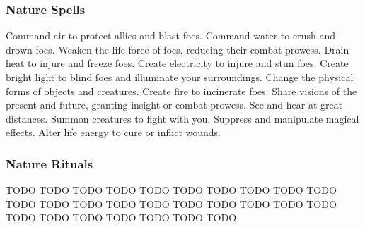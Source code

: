 \subsubsection{Nature Spells}\label{Nature Spells}
\begin{spelllist}
 Command air to protect allies and blast foes.
 Command water to crush and drown foes.
 Weaken the life force of foes, reducing their combat prowess.
 Drain heat to injure and freeze foes.
 Create electricity to injure and stun foes.
 Create bright light to blind foes and illuminate your surroundings.
 Change the physical forms of objects and creatures.
 Create fire to incinerate foes.
 Share visions of the present and future, granting insight or combat prowess.
 See and hear at great distances.
 Summon creatures to fight with you.
 Suppress and manipulate magical effects.
 Alter life energy to cure or inflict wounds.
\end{spelllist}
\subsubsection{Nature Rituals}\label{Nature Rituals}
\begin{spelllist}
 TODO
 TODO
 TODO
 TODO
 TODO
 TODO
 TODO
 TODO
 TODO
 TODO
 TODO
 TODO
 TODO
 TODO
 TODO
 TODO
 TODO
 TODO
 TODO
 TODO
 TODO
 TODO
 TODO
 TODO
 TODO
 TODO
 TODO
\end{spelllist}

